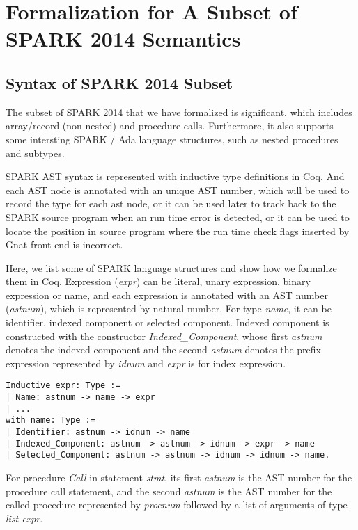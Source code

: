 \section{Formalization for A Subset of SPARK 2014 Semantics}
\subsection{Syntax of SPARK 2014 Subset}
The subset of SPARK 2014 that we have formalized is significant, which includes
array/record (non-nested) and procedure calls. Furthermore, it also supports
some intersting SPARK / Ada language structures, such as nested procedures and
subtypes.

SPARK AST syntax is represented with inductive type definitions in Coq. And each
AST node is annotated with an unique AST number, which will be used to record
the type for each ast node, or it can be used later to track back to the
SPARK source program when an run time error is detected, or it can be used to
locate the position in source program where the run time check flags inserted by
Gnat front end is incorrect.

Here, we list some of SPARK language structures and show how we formalize them
in Coq. Expression (\textit{expr}) can be literal, unary expression, binary
expression or name, and each expression is annotated with an AST number
(\textit{astnum}), which is represented by natural number. For type
\textit{name}, it can be identifier, indexed component or selected component.
Indexed component is constructed with the constructor
\textit{Indexed\_Component}, whose first \textit{astnum} denotes the indexed
component and the second \textit{astnum} denotes the prefix expression
represented by \textit{idnum} and \textit{expr} is for index expression. 

\begin{lstlisting}[escapechar=\#, language=coq, basicstyle=\small]
Inductive expr: Type := 
| Name: astnum -> name -> expr 
| ...
with name: Type := 
| Identifier: astnum -> idnum -> name 
| Indexed_Component: astnum -> astnum -> idnum -> expr -> name 
| Selected_Component: astnum -> astnum -> idnum -> idnum -> name.
\end{lstlisting}

For procedure \textit{Call} in statement \textit{stmt}, its first
\textit{astnum} is the AST number for the procedure call statement, and the
second \textit{astnum} is the AST number for the called procedure represented by 
\textit{procnum} followed by a list of arguments of type \textit{list expr}.

